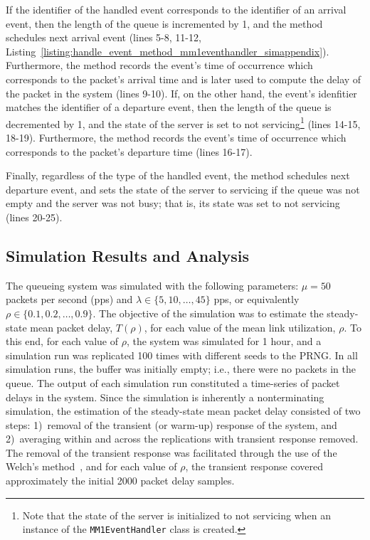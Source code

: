 If the identifier of the handled event corresponds to the identifier of an arrival event, then the length of the queue is incremented by 1, and the method schedules next arrival event (lines 5-8, 11-12, Listing~\ref{listing:handle_event_method_mm1eventhandler_simappendix}). Furthermore, the method records the event's time of occurrence which corresponds to the packet's arrival time and is later used to compute the delay of the packet in the system (lines 9-10). If, on the other hand, the event's idenfitier matches the identifier of a departure event, then the length of the queue is decremented by 1, and the state of the server is set to not servicing\footnote{Note that the state of the server is initialized to not servicing when an instance of the \lstinline{MM1EventHandler} class is created.} (lines 14-15, 18-19). Furthermore, the method records the event's time of occurrence which corresponds to the packet's departure time (lines 16-17).

Finally, regardless of the type of the handled event, the method schedules next departure event, and sets the state of the server to servicing if the queue was not empty and the server was not busy; that is, its state was set to not servicing (lines 20-25).

\subsection{Simulation Results and Analysis}
\label{sub:simulation_results_and_analysis_simappendix}
The queueing system was simulated with the following parameters: $\mu=50$ packets per second (pps) and $\lambda\in\{5,10,\ldots,45\}$ pps, or equivalently $\rho\in\{0.1,0.2,\ldots,0.9\}$. The objective of the simulation was to estimate the steady-state mean packet delay, $T(\rho)$, for each value of the mean link utilization, $\rho$. To this end, for each value of $\rho$, the system was simulated for 1 hour, and a simulation run was replicated 100 times with different seeds to the PRNG. In all simulation runs, the buffer was initially empty; i.e., there were no packets in the queue. The output of each simulation run constituted a time-series of packet delays in the system. Since the simulation is inherently a nonterminating simulation, the estimation of the steady-state mean packet delay consisted of two steps: 1)~removal of the transient (or warm-up) response of the system, and 2)~averaging within and across the replications with transient response removed. The removal of the transient response was facilitated through the use of the Welch's method~\cite{LawChapter92007}, and for each value of $\rho$, the transient response covered approximately the initial 2000 packet delay samples.


